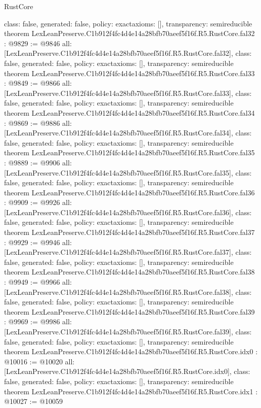 \begin{lexlean}{RustCore}
\begin{coremodule}
{  class: false,
  generated: false,
  policy: exact{axioms: []},
  transparency: semireducible
}
theorem LexLeanPreserve.C1b912f4fc4d4e14a28bfb70aeef5f16f.R5.RustCore.fal32 : @9829 := @9846 {
  all: [LexLeanPreserve.C1b912f4fc4d4e14a28bfb70aeef5f16f.R5.RustCore.fal32],
  class: false,
  generated: false,
  policy: exact{axioms: []},
  transparency: semireducible
}
theorem LexLeanPreserve.C1b912f4fc4d4e14a28bfb70aeef5f16f.R5.RustCore.fal33 : @9849 := @9866 {
  all: [LexLeanPreserve.C1b912f4fc4d4e14a28bfb70aeef5f16f.R5.RustCore.fal33],
  class: false,
  generated: false,
  policy: exact{axioms: []},
  transparency: semireducible
}
theorem LexLeanPreserve.C1b912f4fc4d4e14a28bfb70aeef5f16f.R5.RustCore.fal34 : @9869 := @9886 {
  all: [LexLeanPreserve.C1b912f4fc4d4e14a28bfb70aeef5f16f.R5.RustCore.fal34],
  class: false,
  generated: false,
  policy: exact{axioms: []},
  transparency: semireducible
}
theorem LexLeanPreserve.C1b912f4fc4d4e14a28bfb70aeef5f16f.R5.RustCore.fal35 : @9889 := @9906 {
  all: [LexLeanPreserve.C1b912f4fc4d4e14a28bfb70aeef5f16f.R5.RustCore.fal35],
  class: false,
  generated: false,
  policy: exact{axioms: []},
  transparency: semireducible
}
theorem LexLeanPreserve.C1b912f4fc4d4e14a28bfb70aeef5f16f.R5.RustCore.fal36 : @9909 := @9926 {
  all: [LexLeanPreserve.C1b912f4fc4d4e14a28bfb70aeef5f16f.R5.RustCore.fal36],
  class: false,
  generated: false,
  policy: exact{axioms: []},
  transparency: semireducible
}
theorem LexLeanPreserve.C1b912f4fc4d4e14a28bfb70aeef5f16f.R5.RustCore.fal37 : @9929 := @9946 {
  all: [LexLeanPreserve.C1b912f4fc4d4e14a28bfb70aeef5f16f.R5.RustCore.fal37],
  class: false,
  generated: false,
  policy: exact{axioms: []},
  transparency: semireducible
}
theorem LexLeanPreserve.C1b912f4fc4d4e14a28bfb70aeef5f16f.R5.RustCore.fal38 : @9949 := @9966 {
  all: [LexLeanPreserve.C1b912f4fc4d4e14a28bfb70aeef5f16f.R5.RustCore.fal38],
  class: false,
  generated: false,
  policy: exact{axioms: []},
  transparency: semireducible
}
theorem LexLeanPreserve.C1b912f4fc4d4e14a28bfb70aeef5f16f.R5.RustCore.fal39 : @9969 := @9986 {
  all: [LexLeanPreserve.C1b912f4fc4d4e14a28bfb70aeef5f16f.R5.RustCore.fal39],
  class: false,
  generated: false,
  policy: exact{axioms: []},
  transparency: semireducible
}
theorem LexLeanPreserve.C1b912f4fc4d4e14a28bfb70aeef5f16f.R5.RustCore.idx0 : @10016 := @10020 {
  all: [LexLeanPreserve.C1b912f4fc4d4e14a28bfb70aeef5f16f.R5.RustCore.idx0],
  class: false,
  generated: false,
  policy: exact{axioms: []},
  transparency: semireducible
}
theorem LexLeanPreserve.C1b912f4fc4d4e14a28bfb70aeef5f16f.R5.RustCore.idx1 : @10027 := @10059 {
}
\end{coremodule}
\end{lexlean}
